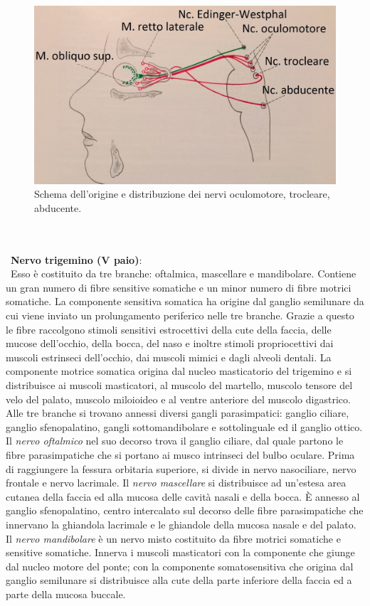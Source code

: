 \\\ \\\
\begin{figure}[h!]
	\centering
	\includegraphics[scale=0.15]{source/immagini/nervo_abducente.jpg}
	\caption[Origine III, IV, VI nervo cranico]{Schema dell'origine e distribuzione dei nervi oculomotore, trocleare, abducente.}
	\label{fig:test10}
\end{figure}
\\\ \\\ 
\textbf{Nervo trigemino (V paio)}: 
\\\ Esso è costituito da tre branche: oftalmica, mascellare e mandibolare. Contiene un gran numero di fibre sensitive somatiche e un minor numero di fibre motrici somatiche. La componente sensitiva somatica ha origine dal ganglio semilunare da cui viene inviato un prolungamento periferico nelle tre branche. Grazie a questo le fibre raccolgono stimoli sensitivi estrocettivi della cute della faccia, delle mucose dell’occhio, della bocca, del naso e inoltre stimoli propriocettivi dai muscoli estrinseci dell’occhio, dai muscoli mimici e dagli alveoli dentali. La componente motrice somatica origina dal nucleo masticatorio del trigemino e si distribuisce ai muscoli masticatori, al muscolo del martello, muscolo tensore del velo del palato, muscolo miloioideo e al ventre anteriore del muscolo digastrico. 
Alle tre branche si trovano annessi diversi gangli parasimpatici: ganglio ciliare, ganglio sfenopalatino, gangli sottomandibolare e sottolinguale ed il ganglio ottico. 
Il \emph{nervo oftalmico} nel suo decorso trova il ganglio ciliare, dal quale partono le fibre parasimpatiche che si portano ai musco intrinseci del bulbo oculare. Prima di raggiungere la fessura orbitaria superiore, si divide in nervo nasociliare, nervo frontale e nervo lacrimale.
Il \emph{nervo mascellare} si distribuisce ad un’estesa area cutanea della faccia ed alla mucosa delle cavità nasali e della bocca. È annesso al ganglio sfenopalatino, centro intercalato sul decorso delle fibre parasimpatiche che innervano la ghiandola lacrimale e le ghiandole della mucosa nasale e del palato.
Il \emph{nervo mandibolare} è un nervo misto costituito da fibre motrici somatiche e sensitive somatiche. Innerva i muscoli masticatori con la componente che giunge dal nucleo motore del ponte; con la componente somatosensitiva che origina dal ganglio semilunare si distribuisce alla cute della parte inferiore della faccia ed a parte della mucosa buccale. 

